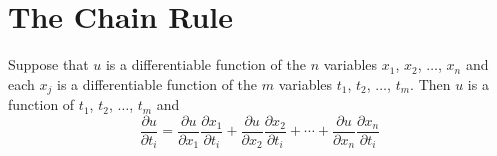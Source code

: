 \section{The Chain Rule}
\begin{definition}
	Suppose that $u$ is a differentiable function of the $n$ variables $x_1$, $x_2$, $\ldots$, $x_n$ and each $x_j$ is a differentiable function of the $m$ variables $t_1$, $t_2$, $\ldots$, $t_m$. Then $u$ is a function of $t_1$, $t_2$, $\ldots$, $t_m$ and
	\begin{equation}
	\label{equation-general-chain-rule}
	\frac{\partial u}{\partial t_i} = \frac{\partial u}{\partial x_1} \frac{\partial x_1}{\partial t_i} + \frac{\partial u}{\partial x_2} \frac{\partial x_2}{\partial t_i} + \cdots + \frac{\partial u}{\partial x_n} \frac{\partial x_n}{\partial t_i}
	\end{equation}
\end{definition}
